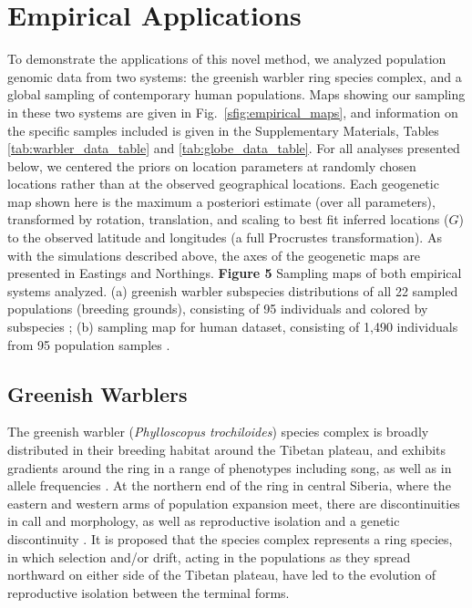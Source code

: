 \documentclass[10pt,letterpaper]{article}
\begin{document}
\section*{Empirical Applications}
To demonstrate the applications of this novel method, we analyzed population genomic data from two systems: the greenish warbler ring species complex, and a global sampling of contemporary human populations.  Maps showing our sampling in these two systems are given in Fig.\ \ref{sfig:empirical_maps}, and information on the specific samples included is given in the Supplementary Materials, Tables \ref{tab:warbler_data_table} and \ref{tab:globe_data_table}.  
For all analyses presented below, 
we centered the priors on location parameters at randomly chosen locations
rather than at the observed geographical locations.
Each geogenetic map shown here is the maximum a posteriori estimate (over all parameters),
transformed by rotation, translation, and scaling to best fit inferred locations ($G$)
to the observed latitude and longitudes (a full Procrustes transformation).
As with the simulations described above, the axes of the geogenetic maps are presented
in Eastings and Northings.
%
\newline\newline
{\bf{Figure 5}} Sampling maps of both empirical systems analyzed.  (a) greenish warbler subspecies distributions of all 22 sampled populations (breeding grounds), consisting of 95 individuals and colored by subspecies \cite{alcaide2014genomic}; (b) sampling map for human dataset, consisting of 1,490 individuals from 95 population samples \cite{Hellenthal}.
\newline\newline

\subsection*{Greenish Warblers}  

The greenish warbler (\textit{Phylloscopus trochiloides}) species complex is broadly distributed in their breeding habitat
around the Tibetan plateau, and exhibits gradients around the ring in a range of phenotypes including song, as well as in allele frequencies \cite{ticehurst1938, Irwin2001, Irwin2005}.  At the northern end of the ring in central Siberia, where the eastern and western arms of population expansion meet, there are discontinuities in call and morphology, as well as reproductive isolation and a genetic discontinuity \cite{Irwin2001, Irwin2008}. It is proposed that the species complex represents a ring species, in which selection and/or drift, acting in the populations as they spread northward on either side of the Tibetan plateau, have led to the evolution of reproductive isolation between the terminal forms.
\end{document}
